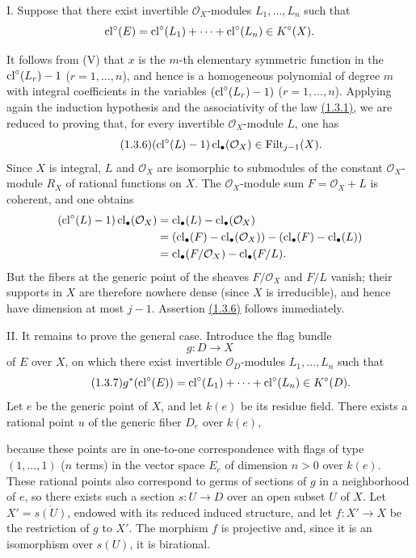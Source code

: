 I. Suppose that there exist invertible $\mathcal O_X$-modules
$L_1,\ldots,L_n$ such that
\[
\operatorname{cl}^\circ(E)=\operatorname{cl}^\circ(L_1)+\cdots+\operatorname{cl}^\circ(L_n)\in K^\circ(X).
\]

It follows from (V) that $x$ is the $m$-th elementary symmetric function in
the $\operatorname{cl}^\circ(L_r)-1$ ($r=1,\ldots,n$), and hence is a homogeneous
polynomial of degree $m$ with integral coefficients in the variables
$(\operatorname{cl}^\circ(L_r)-1)$ ($r=1,\ldots,n$). Applying again the induction
hypothesis and the associativity of the law \hyperlink{sga6.e10.eq.1-3-1}{(1.3.1)}, we are reduced to proving
that, for every invertible $\mathcal O_X$-module $L$, one has
\begin{equation}\tag{1.3.6}
(\operatorname{cl}^\circ(L)-1)\operatorname{cl}_\bullet(\mathcal O_X)\in\operatorname{Filt}_{j-1}(X).
\end{equation}
Since $X$ is integral, $L$ and $\mathcal O_X$ are isomorphic to submodules of
the constant $\mathcal O_X$-module $R_X$ of rational functions on $X$. The
$\mathcal O_X$-module sum $F=\mathcal O_X+L$ is coherent, and one obtains
\begin{align*}
(\operatorname{cl}^\circ(L)-1)\operatorname{cl}_\bullet(\mathcal O_X)
&=\operatorname{cl}_\bullet(L)-\operatorname{cl}_\bullet(\mathcal O_X)\\
&=(\operatorname{cl}_\bullet(F)-\operatorname{cl}_\bullet(\mathcal O_X))
  -(\operatorname{cl}_\bullet(F)-\operatorname{cl}_\bullet(L))\\
&=\operatorname{cl}_\bullet(F/\mathcal O_X)-\operatorname{cl}_\bullet(F/L).
\end{align*}
But the fibers at the generic point of the sheaves $F/\mathcal O_X$ and
$F/L$ vanish; their supports in $X$ are therefore nowhere dense (since $X$
is irreducible), and hence have dimension at most $j-1$. Assertion \hyperlink{sga6.e10.eq.1-3-6}{(1.3.6)}
follows immediately.

II. It remains to prove the general case. Introduce the flag bundle
\[
g:D\longrightarrow X
\]
of $E$ over $X$, on which there exist invertible $\mathcal O_D$-modules
$L_1,\ldots,L_n$ such that
\begin{equation}\tag{1.3.7}
g^*(\operatorname{cl}^\circ(E))=\operatorname{cl}^\circ(L_1)+\cdots+\operatorname{cl}^\circ(L_n)\in K^\circ(D).
\end{equation}
Let $e$ be the generic point of $X$, and let $k(e)$ be its residue field.
There exists a rational point $u$ of the generic fiber $D_e$ over $k(e)$,

because these points are in one-to-one correspondence with flags of type
$(1,\ldots,1)$ ($n$ terms) in the vector space $E_e$ of dimension $n>0$ over
$k(e)$. These rational points also correspond to germs of sections of $g$ in
a neighborhood of $e$, so there exists such a section $s:U\to D$ over an
open subset $U$ of $X$. Let $X'=\overline{s(U)}$, endowed with its reduced
induced structure, and let $f:X'\to X$ be the restriction of $g$ to $X'$.
The morphism $f$ is projective and, since it is an isomorphism over $s(U)$,
it is birational.

